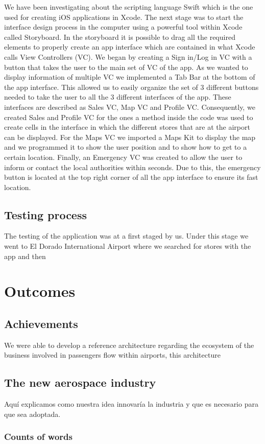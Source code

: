 \documentclass[]{article}
\newcommand\wordcount{
}
\begin{document}
We have been investigating about the scripting language Swift which is the one used for creating iOS applications in Xcode. The next stage was to start the interface design process in the computer using a powerful tool within Xcode called Storyboard. In the storyboard it is possible to drag all the required elements to properly create an app interface which are contained in what Xcode calls View Controllers (VC). We began by creating a Sign in/Log in VC with a button that takes the user to the main set of VC of the app. As we wanted to display information of multiple VC we implemented a Tab Bar at the bottom of the app interface. This allowed us to easily organize the set of 3 different buttons needed to take the user to all the 3 different interfaces of the app. These interfaces are described as Sales VC, Map VC and Profile VC. Consequently, we created Sales and Profile VC for the ones a method inside the code was used to create cells in the interface in which the different stores that are at the airport can be displayed. For the Maps VC we imported a Maps Kit to display the map and we programmed it to show the user position and to show how to get to a certain location. Finally, an Emergency VC was created to allow the user to inform or contact the local authorities within seconds. Due to this, the emergency button is located at the top right corner of all the app interface to ensure its fast location.\\

\subsection{Testing process}

The testing of the application was at a first staged by us. Under this stage we went to El Dorado International Airport where we searched for stores with the app and then 


\section{Outcomes}

\subsection{Achievements}

We were able to develop a reference architecture regarding the ecosystem of the business involved in passengers flow within airports, this architecture 

\subsection{The new aerospace industry}
Aquí explicamos como nuestra idea innovaría la industria y que es necesario para que sea adoptada.



\subsubsection*{Counts of words} 
\wordcount
\end{document}
